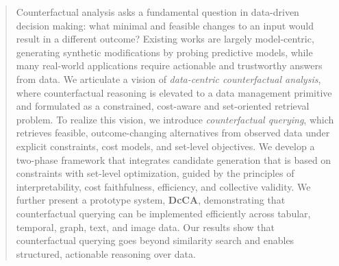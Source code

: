 \begin{abstract}
Counterfactual analysis asks a fundamental question in data-driven decision making: what minimal and feasible changes to an input would result in a different outcome? Existing works are largely model-centric, generating synthetic modifications by probing predictive models, while many real-world applications require actionable and trustworthy answers from data. We articulate a vision of \emph{data-centric counterfactual analysis}, where counterfactual reasoning is elevated to a data management primitive and formulated as a constrained, cost-aware and set-oriented retrieval problem. To realize this vision, we introduce \emph{counterfactual querying}, which retrieves feasible, outcome-changing alternatives from observed data under explicit constraints, cost models, and set-level objectives. We develop a two-phase framework that integrates candidate generation that is based on constraints with set-level optimization, guided by the principles of interpretability, cost faithfulness, efficiency, and collective validity. We further present a prototype system, \textbf{DcCA}, demonstrating that counterfactual querying can be implemented efficiently across tabular, temporal, graph, text, and image data. Our results show that counterfactual querying goes beyond similarity search and enables structured, actionable reasoning over data.
\end{abstract}

